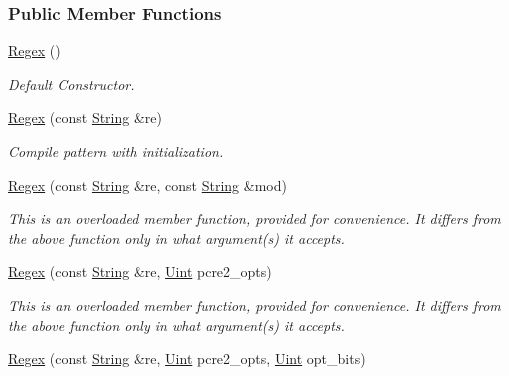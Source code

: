 \subsubsection*{Public Member Functions}
\begin{DoxyCompactItemize}
\item 
\hyperlink{classjpcre2_1_1Regex_a302f65cd5747c5d34570ca76516ab715_a302f65cd5747c5d34570ca76516ab715}{Regex} ()
\begin{DoxyCompactList}\small\item\em Default Constructor. \end{DoxyCompactList}\item 
\hyperlink{classjpcre2_1_1Regex_a4d959fdc32791bee6d819abfc44af51a_a4d959fdc32791bee6d819abfc44af51a}{Regex} (const \hyperlink{namespacejpcre2_a91f03070152fb228bc116c5a737f1d16}{String} \&re)
\begin{DoxyCompactList}\small\item\em Compile pattern with initialization. \end{DoxyCompactList}\item 
\hyperlink{classjpcre2_1_1Regex_a58be9b4e1eaec2a43586af45c6ae5549_a58be9b4e1eaec2a43586af45c6ae5549}{Regex} (const \hyperlink{namespacejpcre2_a91f03070152fb228bc116c5a737f1d16}{String} \&re, const \hyperlink{namespacejpcre2_a91f03070152fb228bc116c5a737f1d16}{String} \&mod)
\begin{DoxyCompactList}\small\item\em This is an overloaded member function, provided for convenience. It differs from the above function only in what argument(s) it accepts. \end{DoxyCompactList}\item 
\hyperlink{classjpcre2_1_1Regex_a8f8a1eabf09292b782a6f33287e3fee4_a8f8a1eabf09292b782a6f33287e3fee4}{Regex} (const \hyperlink{namespacejpcre2_a91f03070152fb228bc116c5a737f1d16}{String} \&re, \hyperlink{namespacejpcre2_a078242d38221a13fb3543b9edd78c099}{Uint} pcre2\+\_\+opts)
\begin{DoxyCompactList}\small\item\em This is an overloaded member function, provided for convenience. It differs from the above function only in what argument(s) it accepts. \end{DoxyCompactList}\item 
\hyperlink{classjpcre2_1_1Regex_abe210e2ca6cfcef11760875930cf069d_abe210e2ca6cfcef11760875930cf069d}{Regex} (const \hyperlink{namespacejpcre2_a91f03070152fb228bc116c5a737f1d16}{String} \&re, \hyperlink{namespacejpcre2_a078242d38221a13fb3543b9edd78c099}{Uint} pcre2\+\_\+opts, \hyperlink{namespacejpcre2_a078242d38221a13fb3543b9edd78c099}{Uint} opt\+\_\+bits)

\end{DoxyCompactItemize}
